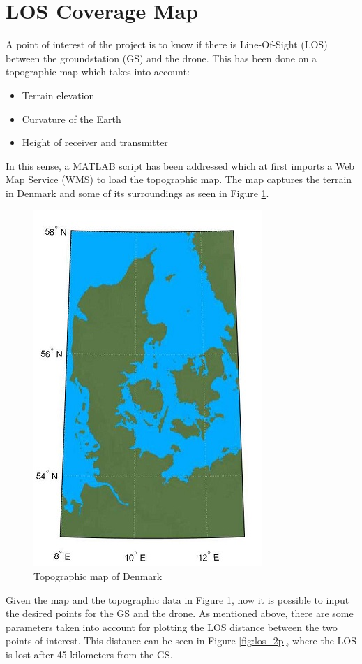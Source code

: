 \section{LOS Coverage Map}\label{sec:los_map}
A point of interest of the project is to know if there is Line-Of-Sight (LOS) between the groundstation (GS) and the drone. This has been done on a topographic map which takes into account:

\begin{itemize}
	\item Terrain elevation
	\item Curvature of the Earth
	\item Height of receiver and transmitter
\end{itemize}

In this sense, a MATLAB script has been addressed which at first imports a Web Map Service (WMS) to load the topographic map. The map captures the terrain in Denmark and some of its surroundings as seen in Figure \ref{fig:dk_map}.

\begin{figure}[h]
	\centering
	\includegraphics[scale=2]{figures/denmark.jpg}
	\caption{Topographic map of Denmark}
   	\label{fig:dk_map}
\end{figure}

Given the map and the topographic data in Figure \ref{fig:dk_map}, now it is possible to input the desired points for the GS and the drone. As mentioned above, there are some parameters taken into account for plotting the LOS distance between the two points of interest. This distance can be seen in Figure \ref{fig:los_2p}, where the LOS is lost after 45 kilometers from the GS.

